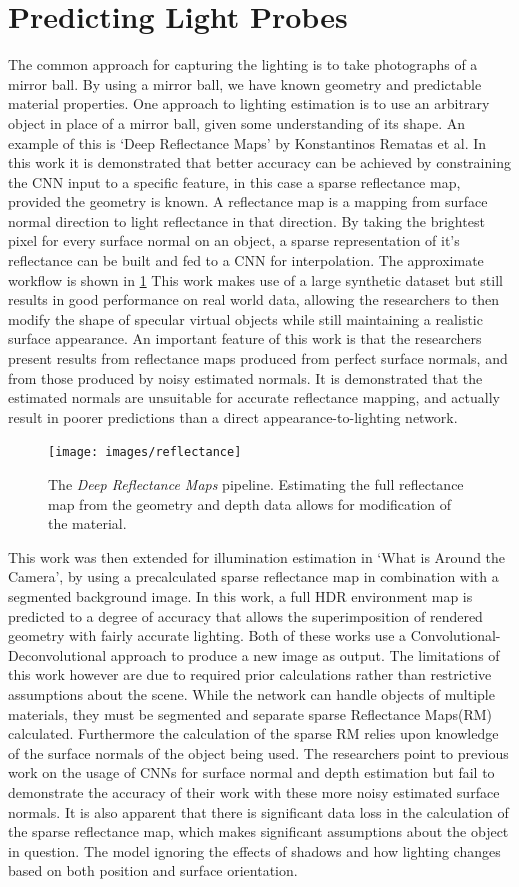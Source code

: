 \documentclass[ %
                    author={Gavin Parker},
                supervisor={Dr. Neill Campbell},
                    degree={MEng},
                     title={Deep Learning for Illumination Estimation from Stereo Images},
                  subtitle={},
                      type={Research},
                      year={2018} ]{dissertation}
\begin{document}
\section{Predicting Light Probes}
The common approach for capturing the lighting is to take photographs of a mirror ball. By using a mirror ball, we have known geometry and predictable material properties. One approach to lighting estimation is to use an arbitrary object in place of a mirror ball, given some understanding of its shape. An example of this is `Deep Reflectance Maps' \cite{RematasCVPR2016} by Konstantinos Rematas et al. In this work it is demonstrated that better accuracy can be achieved by constraining the CNN input to a specific feature, in this case a sparse reflectance map, provided the geometry is known. A reflectance map is a mapping from surface normal direction to light reflectance in that direction. By taking the brightest pixel for every surface normal on an object, a sparse representation of it's reflectance can be built and fed to a CNN for interpolation. The approximate workflow is shown in \ref{fig:refl_pipeline} This work makes use of a large synthetic dataset but still results in good performance on real world data, allowing the researchers to then modify the shape of specular virtual objects while still maintaining a realistic surface appearance. An important feature of this work is that the researchers present results from reflectance maps produced from perfect surface normals, and from those produced by noisy estimated normals. It is demonstrated that the estimated normals are unsuitable for accurate reflectance mapping, and actually result in poorer predictions than a direct appearance-to-lighting network.
\begin{figure}[H]
\texttt{[image: images/reflectance]}
\centering
\caption{The \textit{Deep Reflectance Maps} pipeline. Estimating the full reflectance map from the geometry and depth data allows for modification of the material.}
\label{fig:refl_pipeline}
\end{figure}
This work was then extended for illumination estimation in `What is Around the Camera', by using a precalculated sparse reflectance map in combination with a segmented background image. In this work, a full HDR environment map is predicted to a degree of accuracy that allows the superimposition of rendered geometry with fairly accurate lighting. Both of these works use a Convolutional-Deconvolutional approach to produce a new image as output. The limitations of this work however are due to required prior calculations rather than restrictive assumptions about the scene. While the network can handle objects of multiple materials, they must be segmented and separate sparse Reflectance Maps(RM) calculated. Furthermore the calculation of the sparse RM relies upon knowledge of the surface normals of the object being used. The researchers point to previous work on the usage of CNNs for surface normal and depth estimation but fail to demonstrate the accuracy of their work with these more noisy estimated surface normals. It is also apparent that there is significant data loss in the calculation of the sparse reflectance map, which makes significant assumptions about the object in question. The model ignoring the effects of shadows and how lighting changes based on both position and surface orientation.
\end{document}
